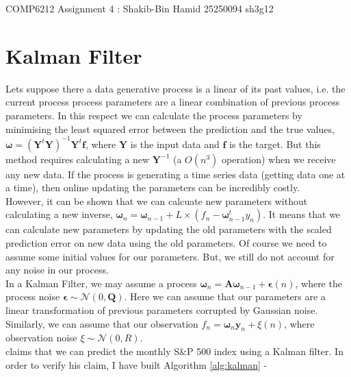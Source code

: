 \documentclass[11pt, fleqn]{article}
\begin{document}
\begin{center}

\Large{COMP6212 Assignment 4 : Shakib-Bin Hamid 25250094 sh3g12}

\end{center}

\section{Kalman Filter}

Lets suppose there a data generative process is a linear of its past values, i.e. the current process process parameters are a linear combination of previous process parameters. In this respect we can calculate the process parameters by minimising the least squared error between the prediction and the true values, $\bm{\omega} = (\bm{Y}^t\bm{Y})^{-1}\bm{Y}^t\bm{f}$, where $\bm{Y}$ is the input data and $\bm{f}$ is the target. But this method requires calculating a new $\bm{Y}^{-1}$ (a $O(n^3)$ operation) when we receive any new data. If the process is generating a time series data (getting data one at a time), then online updating the parameters can be incredibly costly.\\

However, it can be shown that we can calcuate new parameters without calculating a new inverse, $\bm{\omega}_n = \bm{\omega}_{n-1} + L \times (f_n - \bm{\omega}_{n-1}^ty_n)$. It means that we can calculate new parameters by updating the old parameters with the scaled prediction error on new data using the old parameters. Of course we need to assume some initial values for our parameters. But, we still do not account for any noise in our process.\\

In a Kalman Filter, we may assume a process $\bm{\omega}_n = \bm{A}\bm{\omega}_{n-1} + \bm{\epsilon}(n)$, where the process noise $\bm{\epsilon} \sim \mathcal{N}(0, \bm{Q})$. Here we can assume that our parameters are a linear transformation of previous parameters corrupted by Gaussian noise. Similarly, we can assume that our observation $f_n = \bm{\omega}_n\bm{y}_n + \xi(n)$, where observation noise $\xi \sim \mathcal{N}(0, R)$.\\

\cite{mahler} claims that we can predict the monthly S\&P 500 index using a Kalman filter. In order to verify his claim, I have built Algorithm \ref{alg:kalman} -
\end{document}
